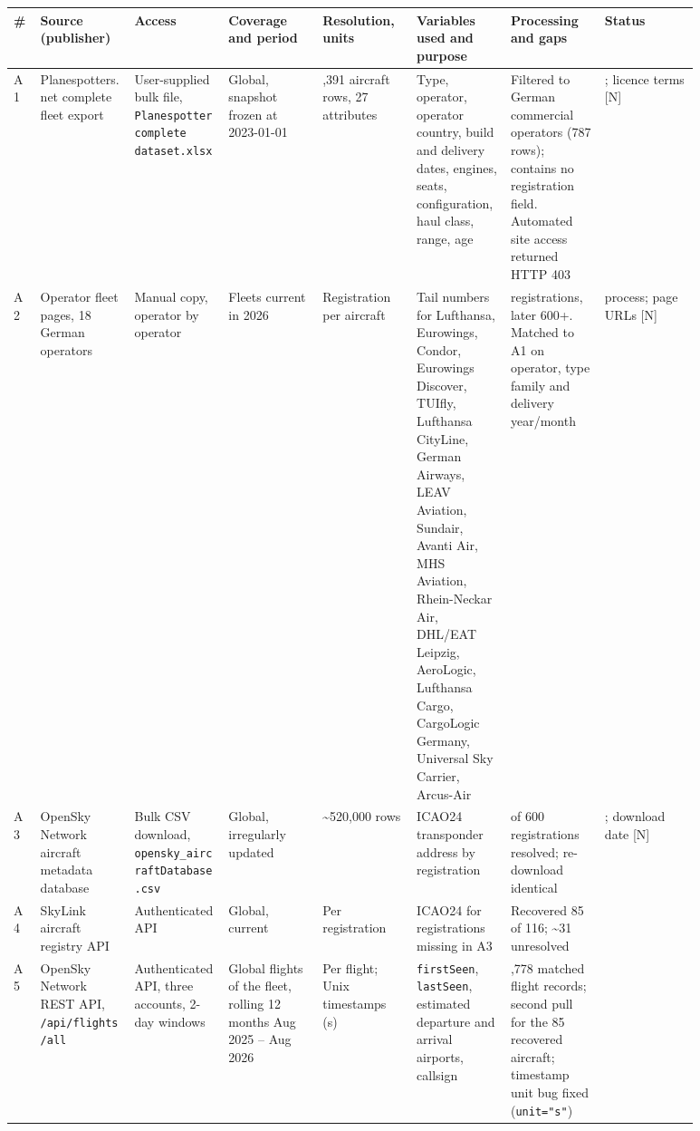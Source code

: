 \documentclass[11pt,a4paper]{article}
\begin{document}
{\footnotesize\setlength{\tabcolsep}{3pt}
\begin{longtable}{>{\raggedright\arraybackslash}p{0.028\linewidth}>{\raggedright\arraybackslash}p{0.122\linewidth}>{\raggedright\arraybackslash}p{0.122\linewidth}>{\raggedright\arraybackslash}p{0.122\linewidth}>{\raggedright\arraybackslash}p{0.122\linewidth}>{\raggedright\arraybackslash}p{0.122\linewidth}>{\raggedright\arraybackslash}p{0.122\linewidth}>{\raggedright\arraybackslash}p{0.122\linewidth}}
\toprule
\textbf{\#} & \textbf{Source (publisher)} & \textbf{Access} & \textbf{Coverage and period} & \textbf{Resolution, units} & \textbf{Variables used and purpose} & \textbf{Processing and gaps} & \textbf{Status} \tabularnewline
\midrule
\endhead
A1 & Planespotters.net complete fleet export \citep{planespotters2023} & User-supplied bulk file, \texttt{Planespotter complete dataset.\allowbreak{}xlsx} & Global, snapshot frozen at 2023-01-01 & 49,391 aircraft rows, 27 attributes & Type, operator, operator country, build and delivery dates, engines, seats, configuration, haul class, range, age & Filtered to German commercial operators (787 rows); contains no registration field. Automated site access returned HTTP 403 & [V]; licence terms [N] \tabularnewline
A2 & Operator fleet pages, 18 German operators & Manual copy, operator by operator & Fleets current in 2026 & Registration per aircraft & Tail numbers for Lufthansa, Eurowings, Condor, Eurowings Discover, TUIfly, Lufthansa CityLine, German Airways, LEAV Aviation, Sundair, Avanti Air, MHS Aviation, Rhein-Neckar Air, DHL/EAT Leipzig, AeroLogic, Lufthansa Cargo, CargoLogic Germany, Universal Sky Carrier, Arcus-Air & 551 registrations, later 600+. Matched to A1 on operator, type family and delivery year/month & [V] process; page URLs [N] \tabularnewline
A3 & OpenSky Network aircraft metadata database \citep{openskydb,schafer2014} & Bulk CSV download, \texttt{opensky\_\allowbreak{}aircraftDatabase.\allowbreak{}csv} & Global, irregularly updated & \textasciitilde{}520,000 rows & ICAO24 transponder address by registration & 484 of 600 registrations resolved; re-download identical & [V]; download date [N] \tabularnewline
A4 & SkyLink aircraft registry API \citep{skylink} & Authenticated API & Global, current & Per registration & ICAO24 for registrations missing in A3 & Recovered 85 of 116; \textasciitilde{}31 unresolved & [V] \tabularnewline
A5 & OpenSky Network REST API, \texttt{/\allowbreak{}api/\allowbreak{}flights/\allowbreak{}all} \citep{openskyapi,schafer2014} & Authenticated API, three accounts, 2-day windows & Global flights of the fleet, rolling 12 months Aug 2025 – Aug 2026 & Per flight; Unix timestamps (s) & \texttt{firstSeen}, \texttt{lastSeen}, estimated departure and arrival airports, callsign & 496,778 matched flight records; second pull for the 85 recovered aircraft; timestamp unit bug fixed (\texttt{unit="s"}) & [V] \tabularnewline

\end{longtable}}
\end{document}

